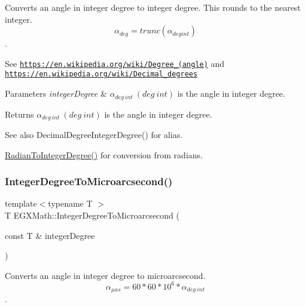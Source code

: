 Converts an angle in integer degree to integer degree. This rounds to the nearest integer. \[\alpha_{deg}=trunc(\alpha_{deg int})\]. 

See \href{https://en.wikipedia.org/wiki/Degree_(angle)}{\tt https\+://en.\+wikipedia.\+org/wiki/\+Degree\+\_\+(angle)} and \href{https://en.wikipedia.org/wiki/Decimal_degrees}{\tt https\+://en.\+wikipedia.\+org/wiki/\+Decimal\+\_\+degrees} 
\begin{DoxyParams}{Parameters}
{\em integer\+Degree} & $\alpha_{deg\ int}\ (deg\ int)$ is the angle in integer degree. \\
\hline
\end{DoxyParams}
\begin{DoxyReturn}{Returns}
$\alpha_{deg\ int}\ (deg\ int)$ is the angle in integer degree. 
\end{DoxyReturn}
\begin{DoxySeeAlso}{See also}
Decimal\+Degree\+Integer\+Degree() for alias. 

\mbox{\hyperlink{group___e_g_x_math-_angle_conversions-_radian_gac84796dfdeb56235e1e338522a5f9350}{Radian\+To\+Integer\+Degree()}} for conversion from radians. 
\end{DoxySeeAlso}
\mbox{\label{group___e_g_x_math-_angle_conversions-_integer_degree_ga69179d6082764595c7014805e1f6b31e}} 
\subsubsection{\texorpdfstring{Integer\+Degree\+To\+Microarcsecond()}{IntegerDegreeToMicroarcsecond()}}
{\footnotesize\ttfamily template$<$typename T $>$ \\
T E\+G\+X\+Math\+::\+Integer\+Degree\+To\+Microarcsecond (\begin{DoxyParamCaption}\item[{const T \&}]{integer\+Degree }\end{DoxyParamCaption})}



Converts an angle in integer degree to microarcsecond. \[\alpha_{\mu as}=60 * 60 * 10^6 * \alpha_{deg\ int}\]. 

